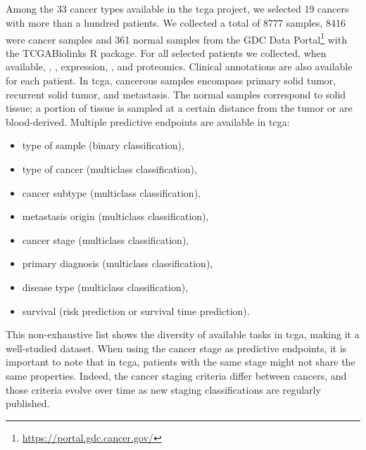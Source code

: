\documentclass[../main.tex]{subfiles}
\begin{document}
	\subsection{}\label{sec:data_tcga}
		Among the 33 cancer types available in the \gls{tcga} project, we selected 19 cancers with more than a hundred patients.
		We collected a total of 8777 samples, 8416 were cancer samples and 361 normal samples from the GDC Data Portal\footnote{\url{https://portal.gdc.cancer.gov/}} with the \textsf{TCGABiolinks} R package.
		For all selected patients we collected, when available, , ,  expression, , and proteomics.
		Clinical annotations are also available for each patient.
		In \gls{tcga}, cancerous samples encompass primary solid tumor, recurrent solid tumor, and metastasis.
		The normal samples correspond to solid tissue; a portion of tissue is sampled at a certain distance from the tumor or are blood-derived.
		Multiple predictive endpoints are available in \gls{tcga}:
		\begin{itemize}[nosep]
			\item type of sample (binary classification),
			\item type of cancer (multiclass classification),
			\item cancer subtype (multiclass classification),
			\item metastasis origin (multiclass classification),
			\item cancer stage (multiclass classification),
			\item primary diagnosis (multiclass classification),
			\item disease type (multiclass classification),
			\item survival (risk prediction or survival time prediction).
		\end{itemize}
		This non-exhaustive list shows the diversity of available tasks in \gls{tcga}, making it a well-studied dataset.
		When using the cancer stage as predictive endpoints, it is important to note that in \gls{tcga}, patients with the same stage might not share the same properties.
		Indeed, the cancer staging criteria differ between cancers, and those criteria evolve over time as new staging classifications are regularly published.

\end{document}
